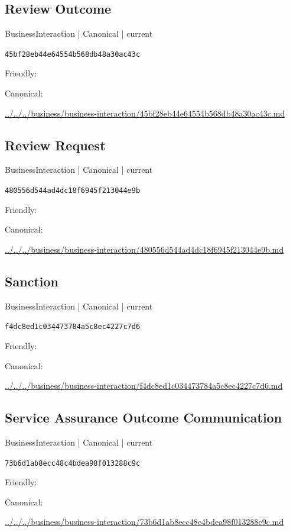 \documentclass[10pt,a4paper]{article}
\begin{document}
\subsection*{Review Outcome}
{\small BusinessInteraction | Canonical | current}\par
\texttt{45bf28eb44e64554b568db48a30ac43c}\par
Friendly: \par
Canonical: \par
{\footnotesize\url{../../../business/business-interaction/45bf28eb44e64554b568db48a30ac43c.md}}\par
\subsection*{Review Request}
{\small BusinessInteraction | Canonical | current}\par
\texttt{480556d544ad4dc18f6945f213044e9b}\par
Friendly: \par
Canonical: \par
{\footnotesize\url{../../../business/business-interaction/480556d544ad4dc18f6945f213044e9b.md}}\par
\subsection*{Sanction}
{\small BusinessInteraction | Canonical | current}\par
\texttt{f4dc8ed1c034473784a5c8ec4227c7d6}\par
Friendly: \par
Canonical: \par
{\footnotesize\url{../../../business/business-interaction/f4dc8ed1c034473784a5c8ec4227c7d6.md}}\par
\subsection*{Service Assurance Outcome Communication}
{\small BusinessInteraction | Canonical | current}\par
\texttt{73b6d1ab8ecc48c4bdea98f013288c9c}\par
Friendly: \par
Canonical: \par
{\footnotesize\url{../../../business/business-interaction/73b6d1ab8ecc48c4bdea98f013288c9c.md}}\par
\end{document}
